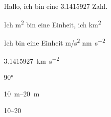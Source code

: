 \documentclass[12pt,ngerman]{scrartcl}
\begin{document}
Hallo, ich bin eine \num{3,1415927} Zahl.

Ich \si{m^2} bin eine Einheit, ich \si{\kilo\m^2}

Ich bin eine Einheit \si{\meter/\second^2} \si{\nano\meter\per\second^2}

\SI{3.1415927}{\kilo\meter\per\second^2}

\ang{90}

\SIrange{10}{20}{\meter}

\numrange{10}{20}
\end{document}
